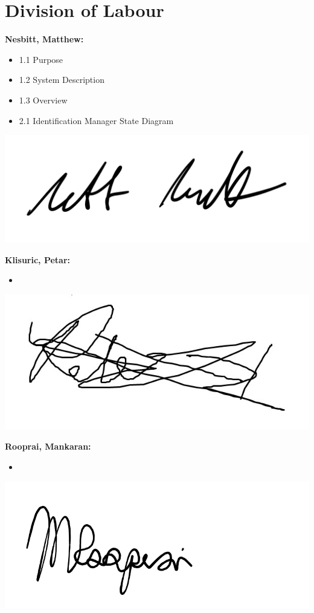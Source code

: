 \documentclass[]{article}
\begin{document}
\appendix
\section{Division of Labour}
\label{sec:division_of_labour}
\textbf{Nesbitt, Matthew:}
\begin{itemize}
	\item 1.1 Purpose
	\item 1.2 System Description
	\item 1.3 Overview
	\item 2.1 Identification Manager State Diagram
\end{itemize}
\includegraphics[scale=0.15]{mattsignature.jpg}

\textbf{Klisuric, Petar:}
\begin{itemize}
  \item   
\end{itemize}
\includegraphics[scale=0.15]{petarsignature.jpg}

\textbf{Rooprai, Mankaran:}
\begin{itemize}
    \item
\end{itemize}
\includegraphics[scale=0.15]{mankaransignature.png}
\end{document}
